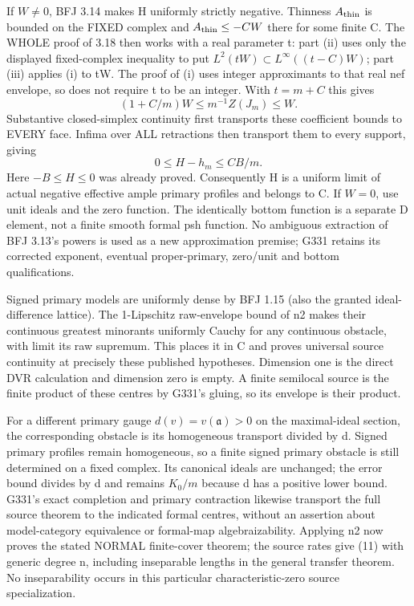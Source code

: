 \documentclass[11pt]{article}
\begin{document}
If $W\ne0$, BFJ 3.14 makes H uniformly strictly negative.
Thinness $A_{\rm thin}$ is bounded on the FIXED complex and
$A_{\rm thin}\le-CW$ there for some finite C. The WHOLE proof of 3.18
then works with a real parameter t: part (ii) uses only the displayed
fixed-complex inequality to put
$L^2(tW)\subset L^\infty((t-C)W)$; part (iii) applies (i) to tW.
The proof of (i) uses integer approximants to that real nef envelope,
so does not require t to be an integer. With $t=m+C$ this gives
\[
          (1+C/m)W\le m^{-1}Z(J_m)\le W.
\]
Substantive closed-simplex continuity first transports these coefficient
bounds to EVERY face. Infima over ALL retractions then transport them
to every support, giving
\[
                 0\le H-h_m\le CB/m.
\]
Here $-B\le H\le0$ was already proved. Consequently H is a uniform
limit of actual negative effective ample primary profiles and belongs
to C. If $W=0$, use unit ideals and the zero function. The identically
bottom function is a separate D element, not a finite smooth formal psh
function. No ambiguous extraction of BFJ 3.13's powers is used as a new
approximation premise; G331 retains its corrected exponent, eventual
proper-primary, zero/unit and bottom qualifications.

Signed primary models are uniformly dense by BFJ 1.15 (also the granted
ideal-difference lattice). The 1-Lipschitz raw-envelope bound of n2
makes their continuous greatest minorants uniformly Cauchy for any
continuous obstacle, with limit its raw supremum. This places it in C
and proves universal source continuity at precisely these published
hypotheses. Dimension one is the direct DVR calculation and dimension
zero is empty. A finite semilocal source is the finite product of these
centres by G331's gluing, so its envelope is their product.

For a different primary gauge $d(v)=v(\mathfrak a)>0$ on the
maximal-ideal section, the corresponding obstacle is its homogeneous
transport divided by d. Signed primary profiles remain homogeneous,
so a finite signed primary obstacle is still determined on a fixed
complex. Its canonical ideals are unchanged; the error bound divides
by d and remains $K_0/m$ because d has a positive lower bound. G331's
exact completion and primary contraction likewise transport the full
source theorem to the indicated formal centres, without an assertion
about model-category equivalence or formal-map algebraizability.
Applying n2 now proves the stated NORMAL finite-cover theorem; the
source rates give (11) with generic degree n, including inseparable
lengths in the general transfer theorem. No inseparability occurs in
this particular characteristic-zero source specialization.
\end{document}

